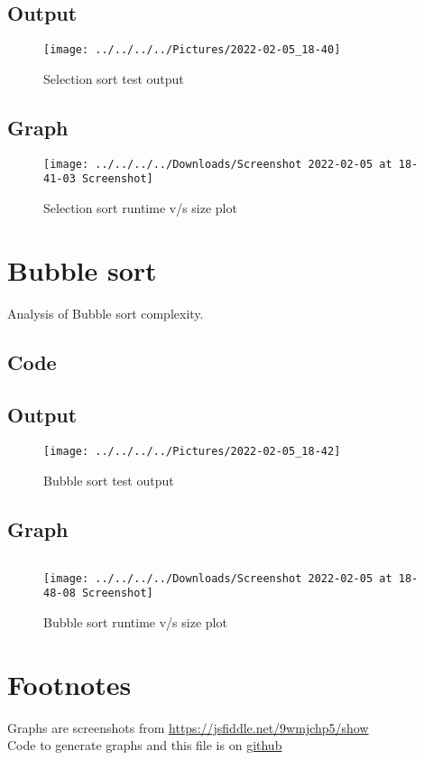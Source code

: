 \documentclass{article}
\begin{document}
    \subsection{Output}
    \begin{figure}[h!]
        \centering
        \texttt{[image: ../../../../Pictures/2022-02-05\_18-40]}
        \caption{Selection sort test output}
    \end{figure}

    \subsection{Graph}
    \begin{figure}[h!]
        \centering
        \texttt{[image: ../../../../Downloads/Screenshot 2022-02-05 at 18-41-03 Screenshot]}
        \caption{Selection sort runtime v/s size plot}
    \end{figure}

    \section{Bubble sort}
    Analysis of Bubble sort complexity.
    \subsection{Code}
    

    \subsection{Output}
    \begin{figure}[h!]
        \centering
        \texttt{[image: ../../../../Pictures/2022-02-05\_18-42]}
        \caption{Bubble sort test output}
    \end{figure}

    \subsection{Graph}
    $ $\\
    \begin{figure}[h!]
        \centering
        \texttt{[image: ../../../../Downloads/Screenshot 2022-02-05 at 18-48-08 Screenshot]}
        \caption{Bubble sort runtime v/s size plot}
    \end{figure}

    \section{Footnotes}
    Graphs are screenshots from \href{https://jsfiddle.net/9wmjchp5/show}{https://jsfiddle.net/9wmjchp5/show} \\
    Code to generate graphs and this file is on \href{https://github.com/pranavgade20/algos_complexity_benchmarker}{github}
\end{document}
